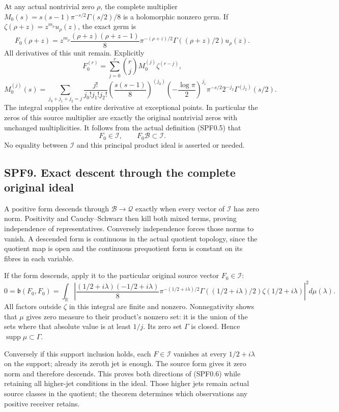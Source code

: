 At any actual nontrivial zero \(\rho\), the complete multiplier
\(M_0(s)=s(s-1)\pi^{-s/2}\Gamma(s/2)/8\) is a holomorphic nonzero germ.
If \(\zeta(\rho+z)=z^{m_\rho}u_\rho(z)\), the exact germ is \[
F_0(\rho+z)=z^{m_\rho}
\frac{(\rho+z)(\rho+z-1)}8
\pi^{-(\rho+z)/2}\Gamma((\rho+z)/2)u_\rho(z).
\tag{SPF8.6}
\] All derivatives of this unit remain. Explicitly \[
F_0^{(r)}=\sum_{j=0}^r\binom rj M_0^{(j)}\zeta^{(r-j)},
\] \[
M_0^{(j)}(s)=\sum_{j_0+j_1+j_2=j}
\frac{j!}{j_0!j_1!j_2!}
\left(\frac{s(s-1)}8\right)^{(j_0)}
\left(-\frac{\log\pi}2\right)^{j_1}\pi^{-s/2}
2^{-j_2}\Gamma^{(j_2)}(s/2).
\tag{SPF8.7}
\] The integral supplies the entire derivative at exceptional points. In
particular the zeros of this source multiplier are exactly the original
nontrivial zeros with unchanged multiplicities. It follows from the
actual definition (SPF0.5) that \[
F_0\in\mathcal I,\qquad F_0\mathcal B\subset\mathcal I.
\tag{SPF8.8}
\] No equality between \(\mathcal I\) and this principal product ideal
is asserted or needed.

\subsection{SPF9. Exact descent through the complete original
ideal}\label{spf9.-exact-descent-through-the-complete-original-ideal}

A positive form descends through \(\mathcal B\to\mathcal Q\) exactly
when every vector of \(\mathcal I\) has zero norm. Positivity and
Cauchy--Schwarz then kill both mixed terms, proving independence of
representatives. Conversely independence forces those norms to vanish. A
descended form is continuous in the actual quotient topology, since the
quotient map is open and the continuous prequotient form is constant on
its fibres in each variable.

If the form descends, apply it to the particular original source vector
\(F_0\in\mathcal I\): \[
0=\mathfrak b(F_0,F_0)
=\int_{\mathbb R}
\left|\frac{(1/2+i\lambda)(-1/2+i\lambda)}8
\pi^{-(1/2+i\lambda)/2}
\Gamma((1/2+i\lambda)/2)\zeta(1/2+i\lambda)\right|^2d\mu(\lambda).
\tag{SPF9.1}
\] All factors outside \(\zeta\) in this integral are finite and
nonzero. Nonnegativity shows that \(\mu\) gives zero measure to their
product's nonzero set: it is the union of the sets where that absolute
value is at least \(1/j\). Its zero set \(\Gamma\) is closed. Hence
\(\operatorname{supp}\mu\subset\Gamma\).

Conversely if this support inclusion holds, each \(F\in\mathcal I\)
vanishes at every \(1/2+i\lambda\) on the support; already its zeroth
jet is enough. The source form gives it zero norm and therefore
descends. This proves both directions of (SPF0.6) while retaining all
higher-jet conditions in the ideal. Those higher jets remain actual
source classes in the quotient; the theorem determines which
observations any positive receiver retains.

